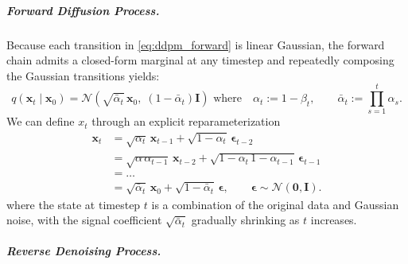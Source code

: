 \subparagraph{Forward Diffusion Process.}

Because each transition in \eqref{eq:ddpm_forward} is linear Gaussian, the forward chain admits a
closed-form marginal at any timestep and repeatedly composing the Gaussian transitions yields:
\begin{equation}
q(\mathbf{x}_t\mid\mathbf{x}_0)
=
\mathcal{N}\!\left(
\sqrt{\bar\alpha_t}\,\mathbf{x}_0,\;
(1-\bar\alpha_t)\mathbf{I}
\right) 
\text{ where} \quad
\alpha_t := 1-\beta_t,
\qquad
\bar\alpha_t := \prod_{s=1}^{t}\alpha_s.
\label{eq:ddpm_forward_marginal}
\end{equation}
We can define $x_t$ through an explicit reparameterization
\begin{align}
\mathbf{x}_t &= \sqrt{\alpha_t} \, \mathbf{x}_{t-1}
+
\sqrt{1-\alpha_t}\,\boldsymbol{\epsilon}_{t-2} \\
&= \sqrt{\alpha\,\alpha_{t-1}}\, \mathbf{x}_{t-2} 
+
\sqrt{1-\alpha_t\,1-\alpha_{t-1}}\,\boldsymbol{\epsilon}_{t-1} \\
&= \dots \\
&=
\sqrt{\bar\alpha_t}\,\mathbf{x}_0
+
\sqrt{1-\bar\alpha_t}\,\boldsymbol{\epsilon},
\qquad
\boldsymbol{\epsilon}\sim\mathcal{N}(\mathbf{0},\mathbf{I}).
\label{eq:reparameterization_of_xt}
\end{align}
where the state at timestep \(t\) is a combination of the original data and Gaussian noise,
with the signal coefficient \(\sqrt{\bar\alpha_t}\) gradually shrinking as \(t\) increases.



\subparagraph{Reverse Denoising Process.}

